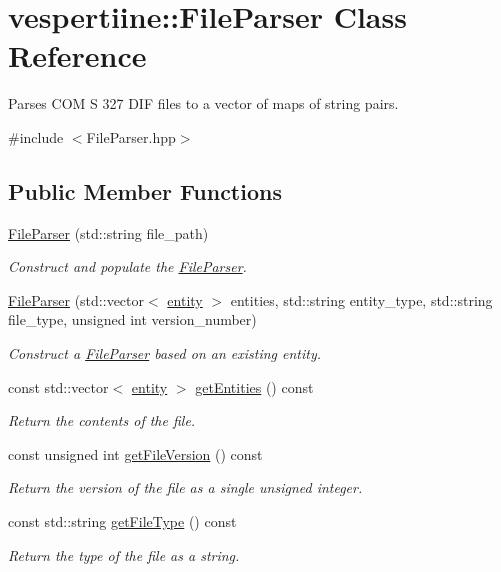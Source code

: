\hypertarget{classvespertiine_1_1FileParser}{}\section{vespertiine\+:\+:File\+Parser Class Reference}
\label{classvespertiine_1_1FileParser}


Parses C\+OM S 327 D\+IF files to a vector of maps of string pairs.  




{\ttfamily \#include $<$File\+Parser.\+hpp$>$}

\subsection*{Public Member Functions}
\begin{DoxyCompactItemize}
\item 
\hyperlink{group__vespertiine_ga01e372573c11d4c2848419c8842d583e}{File\+Parser} (std\+::string file\+\_\+path)
\begin{DoxyCompactList}\small\item\em Construct and populate the \hyperlink{classvespertiine_1_1FileParser}{File\+Parser}. \end{DoxyCompactList}\item 
\hyperlink{group__vespertiine_gad562ef6be958292fbc74803d47b0eda3}{File\+Parser} (std\+::vector$<$ \hyperlink{group__vespertiine_gaf9205d715bdeade18d7039864ef59b44}{entity} $>$ entities, std\+::string entity\+\_\+type, std\+::string file\+\_\+type, unsigned int version\+\_\+number)
\begin{DoxyCompactList}\small\item\em Construct a \hyperlink{classvespertiine_1_1FileParser}{File\+Parser} based on an existing entity. \end{DoxyCompactList}\item 
const std\+::vector$<$ \hyperlink{group__vespertiine_gaf9205d715bdeade18d7039864ef59b44}{entity} $>$ \hyperlink{group__vespertiine_gac2360eb7febe37b75f13dc697a3d37ed}{get\+Entities} () const 
\begin{DoxyCompactList}\small\item\em Return the contents of the file. \end{DoxyCompactList}\item 
const unsigned int \hyperlink{group__vespertiine_ga69070e93ff23a24380d0bad1c096205a}{get\+File\+Version} () const 
\begin{DoxyCompactList}\small\item\em Return the version of the file as a single unsigned integer. \end{DoxyCompactList}\item 
const std\+::string \hyperlink{group__vespertiine_ga950b19f6ead99d8297e37eaeeed2fd3f}{get\+File\+Type} () const 
\begin{DoxyCompactList}\small\item\em Return the type of the file as a string. \end{DoxyCompactList}\end{DoxyCompactItemize}
